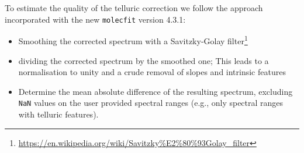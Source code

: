 To estimate the quality of the telluric correction we follow the approach incorporated with the new \texttt{molecfit} version 4.3.1:
\begin{itemize}
    \item Smoothing the corrected spectrum with a Savitzky-Golay filter\footnote{\url{https://en.wikipedia.org/wiki/Savitzky\%E2\%80\%93Golay_filter}}
    \item dividing the corrected spectrum by the smoothed one; This leads to a normalisation to unity and a crude removal of slopes and intrinsic features
    \item Determine the mean absolute difference of the resulting spectrum, excluding \texttt{NaN} values on the user provided spectral ranges (e.g., only spectral ranges with telluric features). 
\end{itemize}
